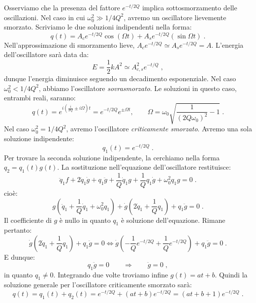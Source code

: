 Osserviamo che la presenza del fattore $e^{-t/2Q}$ implica sottosmorzamento delle oscillazioni. Nel caso in cui $\omega_0^2\gg 1/4Q^2$, avremo un oscillatore lievemente smorzato. Scriviamo le due soluzioni indipendenti nella forma:
\begin{equation}
q(t)=A_ce^{-t/2Q}\cos(\Omega t)+A_se^{-t/2Q}(\sin\Omega t)\;.
\end{equation}
Nell'approssimazione di smorzamento lieve, $A_ce^{-t/2Q}\simeq A_se^{-t/2Q} = A$. L'energia dell'oscillatore sarà data da:
\begin{equation}
E=\frac{1}{2}kA^2\simeq A_{c,s}^2e^{-t/Q}\;,
\end{equation}
dunque l'energia diminuisce seguendo un decadimento esponenziale. Nel caso $\omega_0^2<1/4Q^2$, abbiamo l'oscillatore \textit{sovrasmorzato}. Le soluzioni in questo caso, entrambi reali, saranno:
\begin{equation}
q(t)=e^{i\left(\frac{i}{2Q}\pm i\Omega\right)t}=e^{-t/2Q}e^{\pm\Omega t}, \qquad \Omega=\omega_0\sqrt{\frac{1}{(2Q\omega_0)^2}-1}\;.
\end{equation}
Nel caso $\omega_0^2=1/4Q^2$, avremo l'oscillatore \textit{criticamente smorzato}. Avremo una sola soluzione indipendente:
\begin{equation}
q_1(t)=e^{-t/2Q}\;.
\end{equation}
Per trovare la seconda soluzione indipendente, la cerchiamo nella forma $q_2=q_1(t)g(t)$. La sostituzione nell'equazione dell'oscillatore restituisce:
\begin{equation}
\ddot{q}_1f+2\dot{q}_1\dot{g}+q_1\ddot{g}+\frac{1}{Q}\dot{q}_1g+\frac{1}{Q}q_1\dot{g}+\omega_0^2q_1g=0\;.
\end{equation}
cioè:
\begin{equation}
g\left(\ddot{q}_1+\frac{1}{Q}\dot{q}_1+\omega_0^2q_1\right)+\dot{g}\left(2\dot{q}_1+\frac{1}{Q}q_1\right)+q_1\ddot{g}=0\;.
\end{equation}
Il coefficiente di $g$ è nullo in quanto $q_1$ è soluzione dell'equazione. Rimane pertanto:
\begin{equation}
\dot{g}\left(2\dot{q}_1+\frac{1}{Q}q_1\right)+q_1\ddot{g}=0 \Longleftrightarrow \dot{g}\left(-\frac{1}{Q}e^{-t/2Q}+\frac{1}{Q}e^{-t/2Q}\right)+q_1\ddot{g}=0\;.
\end{equation}
E dunque:
\begin{equation}
q_1\ddot{g}=0\qquad  \Longrightarrow \qquad \ddot{g}=0\;,
\end{equation}
in quanto $q_1\ne 0$. Integrando due volte troviamo infine $g(t)=at+b$. Quindi la soluzione generale per l'oscillatore criticamente smorzato sarà:
\begin{equation}
q(t)=q_1(t)+q_2(t)=e^{-t/2Q}+(at+b)e^{-t/2Q}=(at+b+1)e^{-t/2Q}\;.
\end{equation}
